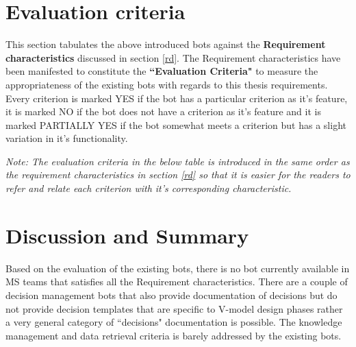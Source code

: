 \section{Evaluation criteria}
\label{evalcrit}
This section tabulates the above introduced bots against the \textbf{Requirement characteristics} discussed in section \ref{rd}. The Requirement characteristics have been manifested to constitute the \textbf{``Evaluation Criteria"} to measure the appropriateness of the existing bots with regards to this thesis requirements. Every  criterion is marked YES if the bot has a particular criterion as it's feature, it is marked NO if the bot does not have a criterion as it's feature and it is marked PARTIALLY YES if the bot somewhat meets a criterion but has a slight variation in it's functionality. 

\textit{Note: The evaluation criteria in the below table is introduced in the same order as the requirement characteristics in section \ref{rd} so that it is easier for the readers to refer and relate each criterion with it's corresponding characteristic.}

\begin{table}[h]
 \centering
{}
\captionsetup{justification=centering}
\caption{Summary of evaluated bots against the evaluation criteria
\label{ec}}
\end{table}

\section{Discussion and Summary}
Based on the evaluation of the existing bots, there is no bot currently available in MS teams that satisfies all the Requirement characteristics. There are a couple of decision management bots that also provide documentation of decisions but do not provide decision templates that are specific to V-model design phases rather a very general category of ``decisions" documentation is possible. The knowledge management and data retrieval criteria is barely addressed by the existing bots. 


